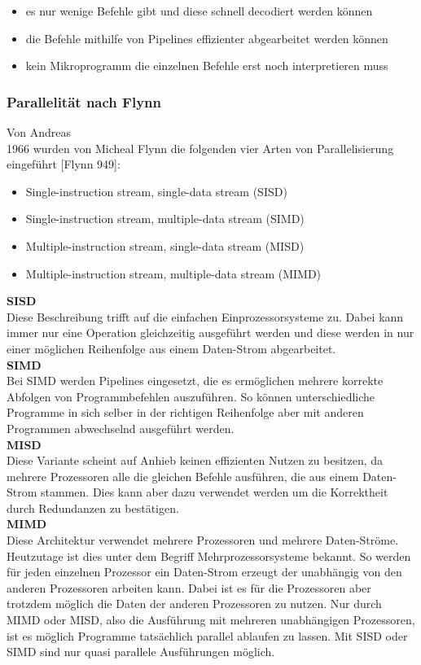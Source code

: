 \documentclass[12pt]{article}
\begin{document}
\begin{itemize}
\item es nur wenige Befehle gibt und diese schnell decodiert werden können
\item die Befehle mithilfe von Pipelines effizienter abgearbeitet werden können
\item kein Mikroprogramm die einzelnen Befehle erst noch interpretieren muss
\end{itemize}
 

\subsubsection{Parallelität nach Flynn}
Von Andreas\\
1966 wurden von Micheal Flynn die folgenden vier Arten von Parallelisierung eingeführt [Flynn 949]:

\begin{itemize}
\item Single-instruction stream, single-data stream (SISD)
\item Single-instruction stream, multiple-data stream (SIMD)
\item Multiple-instruction stream, single-data stream (MISD)
\item Multiple-instruction stream, multiple-data stream (MIMD)
\end{itemize}
\noindent
\textbf{SISD}\\
Diese Beschreibung trifft auf die einfachen Einprozessorsysteme zu. Dabei kann immer nur eine Operation gleichzeitig ausgeführt werden und diese werden in nur einer möglichen Reihenfolge aus einem Daten-Strom abgearbeitet.\\
\noindent
\textbf{SIMD}\\
Bei SIMD werden Pipelines eingesetzt, die es ermöglichen mehrere korrekte Abfolgen von Programmbefehlen auszuführen. So können unterschiedliche Programme in sich selber in der richtigen Reihenfolge aber mit anderen Programmen abwechselnd ausgeführt werden.\\
\noindent
\textbf{MISD}\\
Diese Variante scheint auf Anhieb keinen effizienten Nutzen zu besitzen, da mehrere Prozessoren alle die gleichen Befehle ausführen, die aus einem Daten-Strom stammen. Dies kann aber dazu verwendet werden um die Korrektheit durch Redundanzen zu bestätigen. \\
\noindent
\textbf{MIMD}\\
Diese Architektur verwendet mehrere Prozessoren und mehrere Daten-Ströme. Heutzutage ist dies unter dem Begriff Mehrprozessorsysteme bekannt. So werden für jeden einzelnen Prozessor ein Daten-Strom erzeugt der unabhängig von den anderen Prozessoren arbeiten kann. Dabei ist es für die Prozessoren aber trotzdem möglich die Daten der anderen Prozessoren zu nutzen. Nur durch MIMD oder MISD, also die Ausführung mit mehreren unabhängigen Prozessoren, ist es möglich Programme tatsächlich parallel ablaufen zu lassen. Mit SISD oder SIMD sind nur quasi parallele Ausführungen möglich.\\
\end{document}
